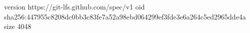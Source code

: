 version https://git-lfs.github.com/spec/v1
oid sha256:447955c8208dc0bb3c83fe7a52a98ebd064299ef3fde3e6a264c5ed2965dde4a
size 4048
